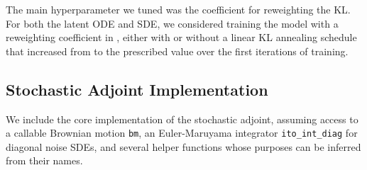 \documentclass[twoside]{article}
\begin{document}
The main hyperparameter we tuned was the coefficient for reweighting the KL. For both the latent ODE and SDE, we considered training the model with a reweighting coefficient in , either with or without a linear KL annealing schedule that increased from  to the prescribed value over the first  iterations of training. 

 \clearpage
\subsection{Stochastic Adjoint Implementation}\label{app:adjoint_code}
We include the core implementation of the stochastic adjoint, assuming access to a callable Brownian motion \texttt{bm}, an Euler-Maruyama integrator \texttt{ito\_int\_diag} for diagonal noise SDEs, and several helper functions whose purposes can be inferred from their names.
\end{document}
